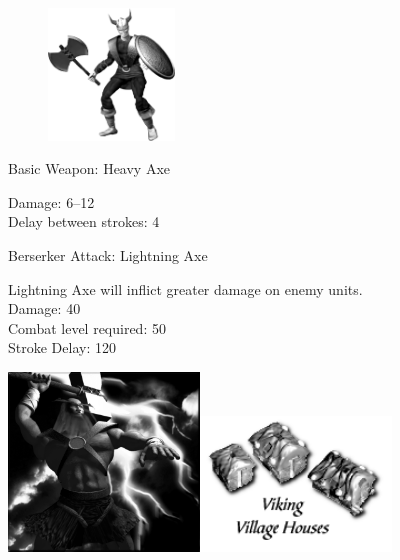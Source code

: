 \begin{figure}
	\begin{center}
		\vspace{-20pt}
		\includegraphics[width=0.3\textwidth]{Aviking}
	\end{center}
	\vspace{-20pt}
\end{figure}

Basic Weapon: Heavy Axe
\begin{adjustwidth}{1cm}{}
	Damage: 6–12 \\
	Delay between strokes: 4
\end{adjustwidth}
Berserker Attack: Lightning Axe
\begin{adjustwidth}{1cm}{}
	Lightning Axe will inflict greater damage on enemy units. \\
	Damage: 40 \\
	Combat level required: 50 \\
	Stroke Delay: 120 
\end{adjustwidth}

\begin{center}
	\includegraphics[width=2in]{Athor}\hspace{1pt}\includegraphics[width=2in]{Ivikinghouse}
\end{center}

